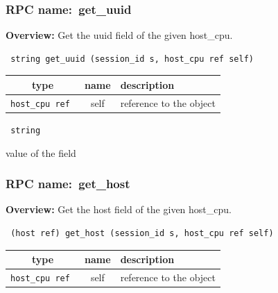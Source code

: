 \subsubsection{RPC name:~get\_uuid}

{\bf Overview:} 
Get the uuid field of the given host\_cpu.

\begin{verbatim} string get_uuid (session_id s, host_cpu ref self)\end{verbatim}



 
\vspace{0.3cm}
\begin{tabular}{|c|c|p{7cm}|}
 \hline
{\bf type} & {\bf name} & {\bf description} \\ \hline
{\tt host\_cpu ref } & self & reference to the object \\ \hline 

\end{tabular}

\vspace{0.3cm}

{\tt 
string
}


value of the field
\vspace{0.3cm}
\vspace{0.3cm}
\vspace{0.3cm}
\subsubsection{RPC name:~get\_host}

{\bf Overview:} 
Get the host field of the given host\_cpu.

\begin{verbatim} (host ref) get_host (session_id s, host_cpu ref self)\end{verbatim}



 
\vspace{0.3cm}
\begin{tabular}{|c|c|p{7cm}|}
 \hline
{\bf type} & {\bf name} & {\bf description} \\ \hline
{\tt host\_cpu ref } & self & reference to the object \\ \hline 

\end{tabular}

\vspace{0.3cm}

